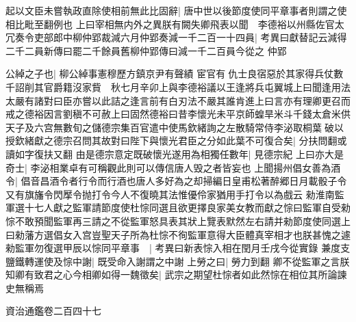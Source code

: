 起以文臣未嘗執政直除使相前無此比固辭|{
	唐中世以後節度使同平章事者則謂之使相比毗至翻例也}
上曰宰相無内外之異朕有闕失卿飛表以聞　李德裕以州縣佐官太冗奏令吏部郎中柳仲郢裁減六月仲郢奏減一千二百一十四員|{
	考異曰獻替記云減得二千二員新傳曰罷二千餘員舊柳仲郢傳曰減一千二百員今從之}
仲郢

公綽之子也|{
	柳公綽事憲穆歷方鎮京尹有聲績}
宦官有仇士良宿惡於其家得兵仗數千詔削其官爵籍沒家貲　秋七月辛卯上與李德裕議以王逢將兵屯翼城上曰聞逢用法太嚴有諸對曰臣亦嘗以此詰之逢言前有白刃法不嚴其誰肯進上曰言亦有理卿更召而戒之德裕因言劉稹不可赦上曰固然德裕曰昔李懷光未平京師蝗旱米斗千錢太倉米供天子及六宫無數旬之儲德宗集百官遣中使馬欽緒詢之左散騎常侍李泌取桐葉破以授欽緒獻之德宗召問其故對曰陛下與懷光君臣之分如此葉不可復合矣|{
	分扶問翻或讀如字復扶又翻}
由是德宗意定既破懷光遂用為相獨任數年|{
	見德宗紀}
上曰亦大是奇士|{
	李泌相業卓有可稱觀此則可以傳信唐人毁之者皆妄也}
上聞揚州倡女善為酒令|{
	倡音昌酒令者行令而行酒也唐人多好為之却掃編日皇甫松著醉郷日月載骰子令又有旗旛令閃擪令抛打令今人不復曉其法惟優伶家猶用手打令以為戲云}
勑淮南監軍選十七人獻之監軍請節度使杜悰同選且欲更擇良家美女教而獻之悰曰監軍自受勑悰不敢預聞監軍再三請之不從監軍怒具表其狀上覽表默然左右請并勑節度使同選上曰勑藩方選倡女入宫豈聖天子所為杜悰不徇監軍意得大臣體真宰相才也朕甚愧之遽勑監軍勿復選甲辰以悰同平章事　|{
	考異曰新表悰入相在閏月壬戌今從實錄}
兼度支鹽鐵轉運使及悰中謝|{
	既受命入謝謂之中謝}
上勞之曰|{
	勞力到翻}
卿不從監軍之言朕知卿有致君之心今相卿如得一魏徵矣|{
	武宗之期望杜悰者如此然悰在相位其所論諫史無稱焉}


資治通鑑卷二百四十七

